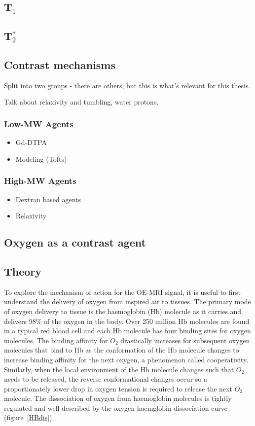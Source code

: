 
\subsection{T$_1$}
\subsection{T$_2^*$}

\subsection{Contrast mechanisms}
Split into two groups - there are others, but this is what's relevant for this thesis.

Talk about relaxivity and tumbling, water protons.

\subsubsection{Low-MW Agents}
\begin{itemize}
\item Gd-DTPA
\item Modeling (Tofts)
\end{itemize}

\subsubsection{High-MW Agents}
\begin{itemize}
\item Dextran based agents
\item Relaxivity
\end{itemize}

\subsection{Oxygen as a contrast agent}
	\subsection{Theory}

To explore the mechanism of action for the OE-MRI signal, it is useful to first understand the delivery of oxygen from inspired air to tissues. 
The primary mode of oxygen delivery to tissue is the haemoglobin (Hb) molecule as it carries and delivers 98\% of the oxygen in the body. 
Over 250 million Hb molecules are found in a typical red blood cell and each Hb molecule has four binding sites for oxygen molecules. 
The binding affinity for ${O_2}$ drastically increases for subsequent oxygen molecules that bind to Hb as the conformation of the Hb molecule changes to increase binding affinity for the next oxygen, a phenomenon called cooperativity. 
Similarly, when the local environment of the Hb molecule changes such that ${O_2}$ needs to be released, the reverse conformational changes occur so a proportionately lower drop in oxygen tension is required to release the next ${O_2}$ molecule. 
The dissociation of oxygen from haemoglobin molecules is tightly regulated and well described by the oxygen-haemglobin dissociation curve (figure~\ref{HBdis}).

